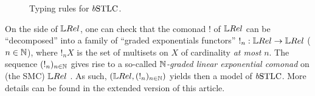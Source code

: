 \begin{figure}
	\caption{Typing rules for $\BSTLC$.}
	\label{fig:rules}
	\end{figure}



On the side of $\LREL$, one can check that the comonad $!$ of $\LREL$ can be ``decomposed'' into a family of ``graded exponentials functors'' $!_n:\LREL\to\LREL$ ($n\in\mathbb{N}$), where $!_{n}X$ is the set of multisets on $X$ of cardinality \emph{at most} $n$. %
The sequence $(!_n)_{n\in\mathbb{N}}$ gives rise to a so-called \emph{$\mathbb{N}$-graded linear exponential comonad} on (the SMC) $\LREL$ \cite{Katsumata2018}. %
As such, $(\LREL,(!_n)_{n\in\N})$ yields then a model of $\BSTLC$. More details can be found in the extended version of this article.

